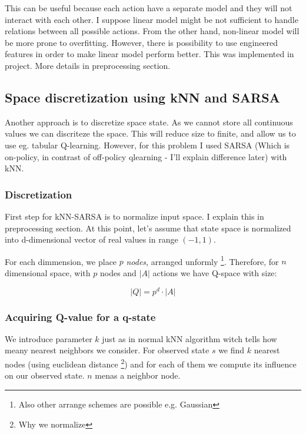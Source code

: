 \documentclass[12pt]{article}
\begin{document}
This can be useful because each action have a separate model and they will not interact with each other. I suppose linear model might be not sufficient to handle relations between all possible actions. From the other hand, non-linear model will be more prone to overfitting. However, there is possibility to use engineered features in order to make linear model perform better. This was implemented in project. More details in preprocessing section. 

\subsection{Space discretization using kNN and SARSA}
Another approach is to discretize space state. As we cannot store all continuous values we can discriteze the space. This will reduce size to finite, and allow us to use eg. tabular Q-learning. However, for this problem I used SARSA (Which is on-policy, in contrast of off-policy qlearning - I'll explain difference later) with kNN.

\subsubsection{Discretization}

First step for kNN-SARSA is to normalize input space. I explain this in preprocessing section. At this point, let's assume that state space is normalized into d-dimensional vector of real values in range $(-1, 1)$.

For each dimmension, we place $p$ \emph{nodes}, arranged unformly \footnote{Also other arrange schemes are possible e.g. Gaussian}. Therefore, for $n$ dimensional space, with $p$ nodes and $|A|$ actions we have Q-space with size:

\begin{equation}
|Q| = p^d \cdot |A|
\end{equation}

\subsubsection{Acquiring Q-value for a q-state}

We introduce parameter $k$ just as in normal kNN algorithm witch tells how meany nearest neighbors we consider. For observed state $s$ we find $k$ nearest nodes (using euclidean distance \footnote{Why we normalize}) and for each of them we compute its influence on our observed state. $n$ menas a neighbor node.
\end{document}
